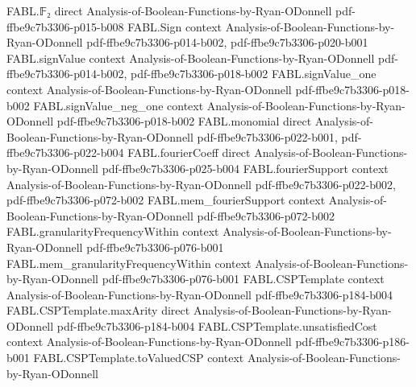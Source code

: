 \begin{theorem}
\label{FABL.UniformStringTester.acceptance_eq_value}
\leanok
{}
\proofstep
  {FABL.𝔽₂}
  {direct}
  {Analysis-of-Boolean-Functions-by-Ryan-ODonnell}
  {pdf-ffbe9c7b3306-p015-b008}
\proofstep
  {FABL.Sign}
  {context}
  {Analysis-of-Boolean-Functions-by-Ryan-ODonnell}
  {pdf-ffbe9c7b3306-p014-b002,
    pdf-ffbe9c7b3306-p020-b001}
\proofstep
  {FABL.signValue}
  {context}
  {Analysis-of-Boolean-Functions-by-Ryan-ODonnell}
  {pdf-ffbe9c7b3306-p014-b002,
    pdf-ffbe9c7b3306-p018-b002}
\proofstep
  {FABL.signValue_one}
  {context}
  {Analysis-of-Boolean-Functions-by-Ryan-ODonnell}
  {pdf-ffbe9c7b3306-p018-b002}
\proofstep
  {FABL.signValue_neg_one}
  {context}
  {Analysis-of-Boolean-Functions-by-Ryan-ODonnell}
  {pdf-ffbe9c7b3306-p018-b002}
\proofstep
  {FABL.monomial}
  {direct}
  {Analysis-of-Boolean-Functions-by-Ryan-ODonnell}
  {pdf-ffbe9c7b3306-p022-b001,
    pdf-ffbe9c7b3306-p022-b004}
\proofstep
  {FABL.fourierCoeff}
  {direct}
  {Analysis-of-Boolean-Functions-by-Ryan-ODonnell}
  {pdf-ffbe9c7b3306-p025-b004}
\proofstep
  {FABL.fourierSupport}
  {context}
  {Analysis-of-Boolean-Functions-by-Ryan-ODonnell}
  {pdf-ffbe9c7b3306-p022-b002,
    pdf-ffbe9c7b3306-p072-b002}
\proofstep
  {FABL.mem_fourierSupport}
  {context}
  {Analysis-of-Boolean-Functions-by-Ryan-ODonnell}
  {pdf-ffbe9c7b3306-p072-b002}
\proofstep
  {FABL.granularityFrequencyWithin}
  {context}
  {Analysis-of-Boolean-Functions-by-Ryan-ODonnell}
  {pdf-ffbe9c7b3306-p076-b001}
\proofstep
  {FABL.mem_granularityFrequencyWithin}
  {context}
  {Analysis-of-Boolean-Functions-by-Ryan-ODonnell}
  {pdf-ffbe9c7b3306-p076-b001}
\proofstep
  {FABL.CSPTemplate}
  {context}
  {Analysis-of-Boolean-Functions-by-Ryan-ODonnell}
  {pdf-ffbe9c7b3306-p184-b004}
\proofstep
  {FABL.CSPTemplate.maxArity}
  {direct}
  {Analysis-of-Boolean-Functions-by-Ryan-ODonnell}
  {pdf-ffbe9c7b3306-p184-b004}
\proofstep
  {FABL.CSPTemplate.unsatisfiedCost}
  {context}
  {Analysis-of-Boolean-Functions-by-Ryan-ODonnell}
  {pdf-ffbe9c7b3306-p186-b001}
\proofstep
  {FABL.CSPTemplate.toValuedCSP}
  {context}
  {Analysis-of-Boolean-Functions-by-Ryan-ODonnell}

\end{theorem}
